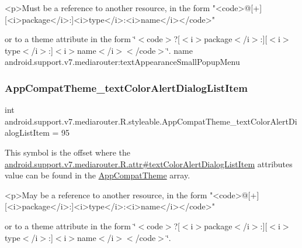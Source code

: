 \begin{DoxyVerb}      <p>Must be a reference to another resource, in the form "<code>@[+][<i>package</i>:]<i>type</i>:<i>name</i></code>"
\end{DoxyVerb}
 or to a theme attribute in the form \char`\"{}$<$code$>$?\mbox{[}$<$i$>$package$<$/i$>$\+:\mbox{]}\mbox{[}$<$i$>$type$<$/i$>$\+:\mbox{]}$<$i$>$name$<$/i$>$$<$/code$>$\char`\"{}.  name android.\+support.\+v7.\+mediarouter\+:text\+Appearance\+Small\+Popup\+Menu \mbox{\label{classandroid_1_1support_1_1v7_1_1mediarouter_1_1R_1_1styleable_a02d892ae076bbe1feac3d55796e9bca8}} 
\subsubsection{\texorpdfstring{App\+Compat\+Theme\+\_\+text\+Color\+Alert\+Dialog\+List\+Item}{AppCompatTheme\_textColorAlertDialogListItem}}
{\footnotesize\ttfamily int android.\+support.\+v7.\+mediarouter.\+R.\+styleable.\+App\+Compat\+Theme\+\_\+text\+Color\+Alert\+Dialog\+List\+Item = 95\hspace{0.3cm}{\ttfamily [static]}}

This symbol is the offset where the \hyperlink{classandroid_1_1support_1_1v7_1_1mediarouter_1_1R_1_1attr_a3eb66c77f697e2794bfb8078badc18ec}{android.\+support.\+v7.\+mediarouter.\+R.\+attr\#text\+Color\+Alert\+Dialog\+List\+Item} attribute\textquotesingle{}s value can be found in the \hyperlink{classandroid_1_1support_1_1v7_1_1mediarouter_1_1R_1_1styleable_a4e3d3900c75d49aeb2f283cac00214d6}{App\+Compat\+Theme} array.

\begin{DoxyVerb}      <p>May be a reference to another resource, in the form "<code>@[+][<i>package</i>:]<i>type</i>:<i>name</i></code>"
\end{DoxyVerb}
 or to a theme attribute in the form \char`\"{}$<$code$>$?\mbox{[}$<$i$>$package$<$/i$>$\+:\mbox{]}\mbox{[}$<$i$>$type$<$/i$>$\+:\mbox{]}$<$i$>$name$<$/i$>$$<$/code$>$\char`\"{}. 

